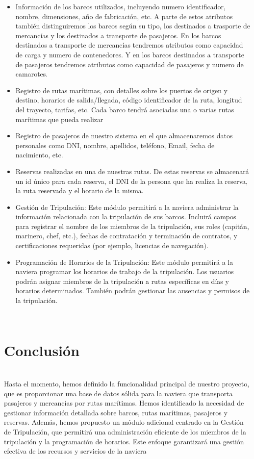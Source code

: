 \documentclass{article}
\begin{document}
\begin{itemize}
    \item Información de los barcos utilizados, incluyendo numero identificador, nombre, dimensiones, año de fabricación, etc. A parte de estos atributos también distinguiremos los barcos según su tipo, los destinados a trasporte de mercancías y los destinados a transporte de pasajeros. En los barcos destinados a transporte de mercancías tendremos atributos como capacidad de carga y numero de contenedores. Y en los barcos destinados a transporte de pasajeros tendremos atributos como capacidad de pasajeros y numero de camarotes.
    \item Registro de rutas marítimas, con detalles sobre los puertos de origen y destino, horarios de salida/llegada, código identificador de la ruta, longitud del trayecto, tarifas, etc. Cada barco tendrá asociadas una o varias rutas marítimas que pueda realizar
    \item Registro de pasajeros de nuestro sistema en el que almacenaremos datos personales como DNI, nombre, apellidos, teléfono, Email, fecha de nacimiento, etc.
    \item Reservas realizadas en una de nuestras rutas. De estas reservas se almacenará un id único para cada reserva, el DNI de la persona que ha realiza la reserva, la ruta reservada y el horario de la misma.
    \item Gestión de Tripulación: Este módulo permitirá a la naviera administrar la información relacionada con la tripulación de sus barcos. Incluirá campos para registrar el nombre de los miembros de la tripulación, sus roles (capitán, marinero, chef, etc.), fechas de contratación y terminación de contratos, y certificaciones requeridas (por ejemplo, licencias de navegación).
    \item Programación de Horarios de la Tripulación: Este módulo permitirá a la naviera programar los horarios de trabajo de la tripulación. Los usuarios podrán asignar miembros de la tripulación a rutas específicas en días y horarios determinados. También podrán gestionar las ausencias y permisos de la tripulación.
\end{itemize}\\

\section{Conclusión}\\

Hasta el momento, hemos definido la funcionalidad principal de nuestro proyecto, que es proporcionar una base de datos sólida para la naviera que transporta pasajeros y mercancías por rutas marítimas. Hemos identificado la necesidad de gestionar información detallada sobre barcos, rutas marítimas, pasajeros y reservas. Además, hemos propuesto un módulo adicional centrado en la Gestión de Tripulación, que permitirá una administración eficiente de los miembros de la tripulación y la programación de horarios. Este enfoque garantizará una gestión efectiva de los recursos y servicios de la naviera
\end{document}
